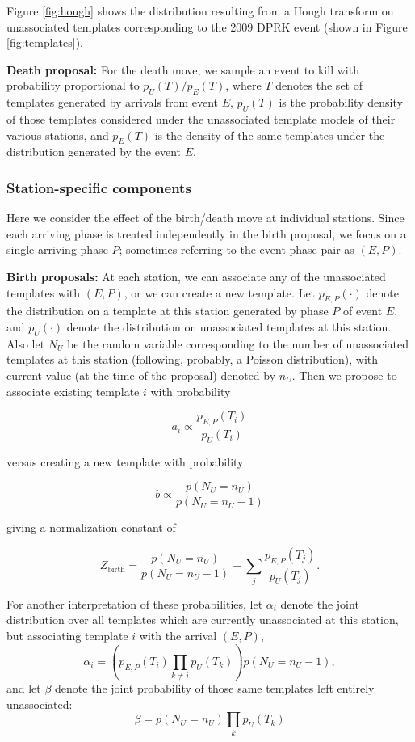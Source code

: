 \documentclass{article}
\begin{document}
Figure \ref{fig:hough} shows the distribution resulting from a Hough transform on unassociated templates corresponding to the 2009 DPRK event (shown in Figure \ref{fig:templates}). 


{\bf Death proposal:} For the death move, we sample an event to kill with probability proportional to $p_U(T)/p_E(T)$, where $T$ denotes the set of templates generated by arrivals from event $E$, $p_U(T)$ is the probability density of those templates considered under the unassociated template models of their various stations, and $p_E(T)$ is the density of the same templates under the distribution generated by the event $E$. 

\subsubsection{Station-specific components}

Here we consider the effect of the birth/death move at individual stations. Since each arriving phase is treated independently in the birth proposal, we focus on a single arriving phase $P$; sometimes referring to the event-phase pair as $(E,P)$.

{\bf Birth proposals:} At each station, we can associate any of the unassociated templates with $(E,P)$, or we can create a new template. Let $p_{E,P}(\cdot)$ denote the distribution on a template at this station generated by phase $P$ of event $E$, and $p_U(\cdot)$ denote the distribution on unassociated templates at this station. Also let $N_U$ be the random variable corresponding to the number of unassociated templates at this station (following, probably, a Poisson distribution), with current value (at the time of the proposal) denoted by $n_U$. Then we propose to associate existing template $i$ with probability

\[a_i \propto \frac{p_{E, P}(T_i)}{p_U(T_i)}\]

versus creating a new template with probability

\[b \propto \frac{p(N_U = n_U)}{p(N_U = n_U - 1)}\]

giving a normalization constant of

\[Z_\text{birth} = \frac{p(N_U = n_U)}{p(N_U = n_U - 1)} + \sum_j  \frac{p_{E, P}(T_j)}{p_U(T_j)}.\]

For another interpretation of these probabilities, let $\alpha_i$ denote the joint distribution over all templates which are currently unassociated at this station, but associating template $i$ with the arrival $(E,P)$,
\[\alpha_i = \left(p_{E, P}(T_i)\prod_{k \ne i} p_U(T_k) \right)p(N_U = n_U - 1),\]
and let $\beta$ denote the joint probability of those same templates left entirely unassociated:
\[\beta = p(N_U = n_U)\prod_k p_U(T_k)\]
\end{document}
